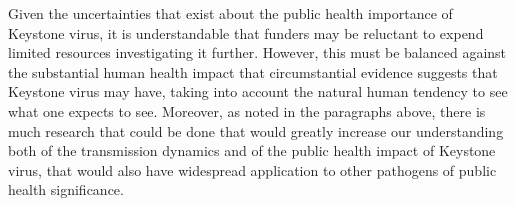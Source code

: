 \documentclass[12pt]{article}
\begin{document}
        Given the uncertainties that exist about the public health importance of Keystone virus, it is understandable that funders may be reluctant to expend limited resources investigating it further. However, this must be balanced against the substantial human health impact that circumstantial evidence suggests that Keystone virus may have, taking into account the natural human tendency to see what one expects to see. Moreover, as noted in the paragraphs above, there is much research that could be done that would greatly increase our understanding both of the transmission dynamics and of the public health impact of Keystone virus, that would also have widespread application to other pathogens of public health significance.

    \printbibliography{}
\end{document}

